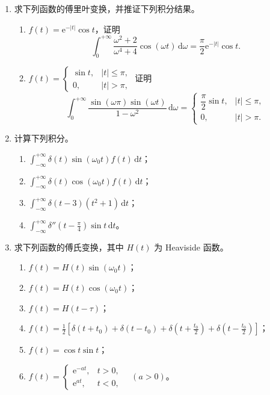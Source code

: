\documentclass[UTF8,11pt,a4paper]{ctexart}
\newcommand{\dd}{\,\mathrm{d}}
\newcommand{\ee}{\mathrm{e}}
\begin{document}
\begin{enumerate}
\item 求下列函数的傅里叶变换，并推证下列积分结果。
  \begin{enumerate}
  \item $f(t)=\ee^{-|t|}\cos t$，证明
  \[
  \int_0^{+\infty}\frac{\omega^2+2}{\omega^4+4}\cos(\omega t)\dd\omega
  =\frac\pi2\ee^{-|t|}\cos t.
  \]
  \item $\displaystyle f(t)=\begin{cases}\sin t,&|t|\leqslant\pi,\\0,&|t|>\pi,
  \end{cases}$ 证明
  \[
  \int_0^{+\infty}\frac{\sin(\omega\pi)\sin(\omega t)}{1-\omega^2}\dd\omega
  =\begin{cases}\dfrac\pi2\sin t,&|t|\leqslant\pi,\\0,&|t|>\pi.\end{cases}
  \]
  \end{enumerate}

\item 计算下列积分。
  \begin{enumerate}
  \item $\displaystyle\int_{-\infty}^{+\infty}\delta(t)\sin(\omega_0t)f(t)\dd t$；
  \item $\displaystyle\int_{-\infty}^{+\infty}\delta(t)\cos(\omega_0t)f(t)\dd t$；
  \item $\displaystyle\int_{-\infty}^{+\infty}\delta(t-3)(t^2+1)\dd t$；
  \item $\displaystyle\int_{-\infty}^{+\infty}\delta''\!\left(t-\frac\pi4\right)\sin t\dd t$。
  \end{enumerate}

\item 求下列函数的傅氏变换，其中 $H(t)$ 为 Heaviside 函数。
  \begin{enumerate}
  \item $f(t)=H(t)\sin(\omega_0t)$；
  \item $f(t)=H(t)\cos(\omega_0t)$；
  \item $f(t)=H(t-\tau)$；
  \item $\displaystyle f(t)=\frac12\left[\delta(t+t_0)+\delta(t-t_0)+\delta\left(t+\frac{t_0}{2}\right)+\delta\left(t-\frac{t_0}{2}\right)\right]$；
  \item $f(t)=\cos t\sin t$；
  \item $\displaystyle f(t)=\begin{cases}\ee^{-at},&t>0,\\\ee^{at},&t<0,
  \end{cases}\quad(a>0)$。
  \end{enumerate}


\end{enumerate}
\end{document}
